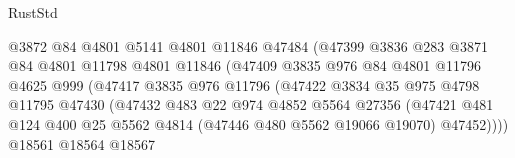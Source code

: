 \begin{lexlean}{RustStd}
\begin{coremodule}
                                    @3872
                                    @84
                                    @4801
                                    @5141
                                    @4801
                                    @11846
                                    @47484
                                    (@47399
                                      @3836
                                      @283
                                      @3871
                                      @84
                                      @4801
                                      @11798
                                      @4801
                                      @11846
                                      (@47409
                                        @3835
                                        @976
                                        @84
                                        @4801
                                        @11796
                                        @4625
                                        @999
                                        (@47417
                                          @3835
                                          @976
                                          @11796
                                          (@47422
                                            @3834
                                            @35
                                            @975
                                            @4798
                                            @11795
                                            @47430
                                            (@47432
                                              @483
                                              @22
                                              @974
                                              @4852
                                              @5564
                                              @27356
                                              (@47421
                                                @481
                                                @124
                                                @400
                                                @25
                                                @5562
                                                @4814
                                                (@47446 @480 @5562 @19066 @19070)
                                                @47452))))
                                        @18561
                                        @18564
                                        @18567

\end{coremodule}
\end{lexlean}
